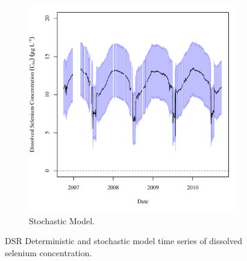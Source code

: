 \begin{linenumbers}
\begin{landscape}
\begin{figure}
\begin{subfigure}{0.7\textwidth}
			\includegraphics[width=\tableCustomSize]{"Figures/Results_DSR/Stochastic/c TS BUF"}
			\caption{Stochastic Model.}
		\end{subfigure}
		\caption{DSR Deterministic and stochastic model time series of dissolved selenium concentration.}
	\end{figure}
\end{landscape}


\end{linenumbers}
